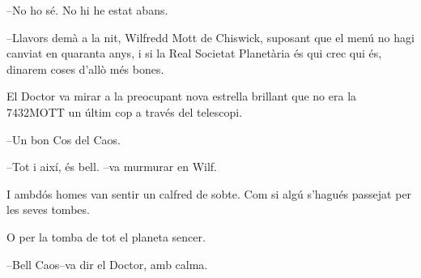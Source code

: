 --No ho sé. No hi he estat abans.

--Llavors demà a la nit, Wilfredd Mott de Chiswick, suposant que el menú
no hagi canviat en quaranta anys, i si la Real Societat Planetària és
qui crec qui és, dinarem coses d'allò més bones.

El Doctor va mirar a la preocupant nova estrella brillant que no era la
7432MOTT un últim cop a través del telescopi.

--Un bon Cos del Caos.

--Tot i així, és bell. --va murmurar en Wilf.

I ambdós homes van sentir un calfred de sobte. Com si algú s'hagués
passejat per les seves tombes.

O per la tomba de tot el planeta sencer.

--Bell Caos--va dir el Doctor, amb calma.
